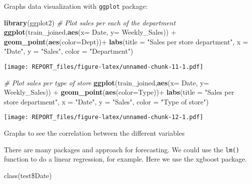 \documentclass[11pt,]{article}
\newenvironment{Shaded}{\begin{snugshade}}{\end{snugshade}}
\newcommand{\KeywordTok}[1]{\textcolor[rgb]{0.13,0.29,0.53}{\textbf{{#1}}}}
\newcommand{\DataTypeTok}[1]{\textcolor[rgb]{0.13,0.29,0.53}{{#1}}}
\newcommand{\StringTok}[1]{\textcolor[rgb]{0.31,0.60,0.02}{{#1}}}
\newcommand{\CommentTok}[1]{\textcolor[rgb]{0.56,0.35,0.01}{\textit{{#1}}}}
\newcommand{\NormalTok}[1]{{#1}}
\begin{document}
Graphs data visualization with \texttt{ggplot} package:

\begin{Shaded}
\begin{Highlighting}[]
\KeywordTok{library}\NormalTok{(ggplot2)}
\CommentTok{# Plot sales per each of the department}
\KeywordTok{ggplot}\NormalTok{(train_joined,}\KeywordTok{aes}\NormalTok{(}\DataTypeTok{x=} \NormalTok{Date, }\DataTypeTok{y=} \NormalTok{Weekly_Sales)) +}\StringTok{ }\KeywordTok{geom_point}\NormalTok{(}\KeywordTok{aes}\NormalTok{(}\DataTypeTok{color=}\NormalTok{Dept))+}\StringTok{ }\KeywordTok{labs}\NormalTok{(}\DataTypeTok{title =} \StringTok{"Sales per store department"}\NormalTok{, }\DataTypeTok{x =} \StringTok{"Date"}\NormalTok{, }\DataTypeTok{y =} \StringTok{"Sales"}\NormalTok{, }\DataTypeTok{color =} \StringTok{"Department"}\NormalTok{)}
\end{Highlighting}
\end{Shaded}

\texttt{[image: REPORT\_files/figure-latex/unnamed-chunk-11-1.pdf]}

\begin{Shaded}
\begin{Highlighting}[]
\CommentTok{# Plot sales per type of store}
\KeywordTok{ggplot}\NormalTok{(train_joined,}\KeywordTok{aes}\NormalTok{(}\DataTypeTok{x=} \NormalTok{Date, }\DataTypeTok{y=} \NormalTok{Weekly_Sales)) +}\StringTok{ }\KeywordTok{geom_point}\NormalTok{(}\KeywordTok{aes}\NormalTok{(}\DataTypeTok{color=}\NormalTok{Type))+}\StringTok{ }\KeywordTok{labs}\NormalTok{(}\DataTypeTok{title =} \StringTok{"Sales per store department"}\NormalTok{, }\DataTypeTok{x =} \StringTok{"Date"}\NormalTok{, }\DataTypeTok{y =} \StringTok{"Sales"}\NormalTok{, }\DataTypeTok{color =} \StringTok{"Type of store"}\NormalTok{)}
\end{Highlighting}
\end{Shaded}

\texttt{[image: REPORT\_files/figure-latex/unnamed-chunk-12-1.pdf]}

Graphs to see the correlation between the different variables

There are many packages and approach for forecasting. We could use the
\texttt{lm()} function to do a linear regression, for example. Here we
use the xgboost package.

class(test\$Date)
\end{document}
